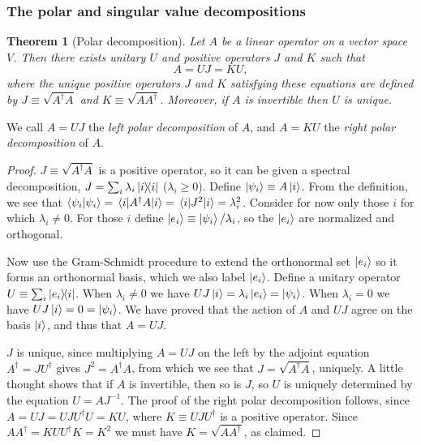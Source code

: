 \documentclass{article}
\newtheorem{theorem}{Theorem}
\numberwithin{theorem}{section}
\numberwithin{corollary}{section}
\begin{document}
\subsubsection{The polar and singular value decompositions}

\begin{theorem}[Polar decomposition]
  Let $A$ be a linear operator on a vector space $V$. Then there exists unitary
  $U$ and positive operators $J$ and $K$ such that \[
    A = UJ = KU,
  \] where the unique positive operators $J$ and $K$ satisfying these equations
  are defined by $J \equiv \sqrt{A^{\dagger}A}$ and $K \equiv
  \sqrt{AA^{\dagger}}$. Moreover, if $A$ is invertible then $U$ is unique.
\end{theorem}

We call $A = UJ$ the \emph{left polar decomposition} of $A$, and $A = KU$ the
\emph{right polar decomposition} of $A$.

\begin{proof}
  $J \equiv \sqrt{A^{\dagger}A}$ is a positive operator, so it can be given a
  spectral decomposition, $J = \sum_i \lambda_i\op{i}{i}$ ($\lambda_i \geq 0$).
  Define $\ket{\psi_i} \equiv A\ket{i}$. From the definition, we see that
  $\ip{\psi_i}{\psi_i} = \mel{i}{A^{\dagger}A}{i} = \mel{i}{J^2}{i} =
  \lambda_i^2$. Consider for now only those $i$ for which $\lambda_i \neq 0$.
  For those $i$ define $\ket{e_i} \equiv \ket{\psi_i}/\lambda_i$, so the
  $\ket{e_i}$ are normalized and orthogonal.

  Now use the Gram-Schmidt procedure to extend the orthonormal set $\ket{e_i}$
  so it forms an orthonormal basis, which we also label $\ket{e_i}$. Define a
  unitary operator $U \equiv \sum_i \op{e_i}{i}$. When $\lambda_i \neq 0$ we
  have $UJ\ket{i} = \lambda_i\ket{e_i} = \ket{\psi_i}$. When $\lambda_i = 0$ we
  have $UJ\ket{i} = 0 = \ket{\psi_i}$. We have proved that the action of $A$
  and $UJ$ agree on the basis $\ket{i}$, and thus that $A = UJ$.

  $J$ is unique, since multiplying $A = UJ$ on the left by the adjoint equation
  $A^{\dagger} = JU^{\dagger}$ gives $J^2 = A^{\dagger}A$, from which we see
  that $J = \sqrt{A^{\dagger}A}$, uniquely. A little thought shows that if $A$
  is invertible, then so is $J$, so $U$ is uniquely determined by the equation
  $U = AJ^{-1}$. The proof of the right polar decomposition follows, since $A =
  UJ = UJU^{\dagger}U = KU$, where $K \equiv UJU^{\dagger}$ is a positive
  operator. Since $AA^{\dagger} = KUU^{\dagger}K = K^2$ we must have $K =
  \sqrt{AA^{\dagger}}$, as claimed.
\end{proof}
\end{document}
